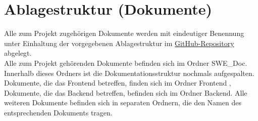 
\chapter{Ablagestruktur (Dokumente)}
Alle zum Projekt zugehörigen Dokumente werden mit eindeutiger Benennung unter Einhaltung der vorgegebenen Ablagestruktur im \href{https://github.com/LucRome/SWE_Semester4}{GitHub-Repository} abgelegt.\\

Alle zum Projekt gehörenden Dokumente befinden sich im Ordner \glqq SWE\_Doc\grqq. \\
Innerhalb dieses Ordners ist die Dokumentationsstruktur nochmals aufgespalten. Dokumente, die das Frontend betreffen, finden sich im Ordner \glqq Frontend \grqq , Dokumente, die das Backend betreffen, befinden sich im Ordner \glqq Backend\grqq. Alle weiteren Dokumente befinden sich in separaten Ordnern, die den Namen des entsprechenden Dokuments tragen.\\
